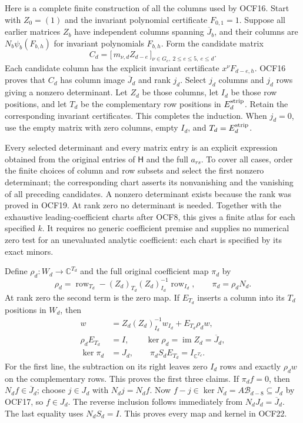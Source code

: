 \documentclass[11pt]{article}
\begin{document}
Here is a complete finite construction of all the columns used
by OCF16. Start with $Z_0=(1)$ and the invariant polynomial
certificate $F_{0,1}=1$. Suppose all earlier matrices $Z_b$ have
independent columns spanning $\overline J_b$, and their columns
are $N_b\psi_b(F_{b,h})$ for invariant polynomials $F_{b,h}$.
Form the candidate matrix
\[
 C_d=\bigl[\,m_{\nu,d}Z_{d-e}\,\bigr]_{
                    \nu\in G_e,\ 2\leq e\leq5,\ e\leq d}.
 \tag{OCF20}
\]
Each candidate column has the explicit invariant certificate
$x^\nu F_{d-e,h}$. OCF16 proves that $C_d$ has column image
$\overline J_d$ and rank $j_d$. Select $j_d$ columns and $j_d$
rows giving a nonzero determinant. Let $Z_d$ be those columns,
let $I_d$ be those row positions, and let $T_d$ be the complementary
row positions in $E_d^{\rm strip}$. Retain the corresponding
invariant certificates. This completes the induction. When
$j_d=0$, use the empty matrix with zero columns, empty $I_d$,
and $T_d=E_d^{\rm strip}$.

Every selected determinant and every matrix entry is an explicit
expression obtained from the original entries of $\mathsf H$ and
the full $a_{rs}$. To cover all cases, order the finite choices
of column and row subsets and select the first nonzero determinant;
the corresponding chart asserts its nonvanishing and the vanishing
of all preceding candidates. A nonzero determinant exists because
the rank was proved in OCF19. At rank zero no determinant is needed.
Together with the exhaustive leading-coefficient charts after
OCF8, this gives a finite atlas for each specified $k$. It requires
no generic coefficient premise and supplies no numerical zero test
for an unevaluated analytic coefficient: each chart is specified
by its exact minors.

Define $\rho_d:W_d\to\mathbb C^{T_d}$ and the full original
coefficient map $\pi_d$ by
\[
 \rho_d=\operatorname{row}_{T_d}
            -(Z_d)_{T_d}(Z_d)_{I_d}^{-1}
                                  \operatorname{row}_{I_d},
 \qquad \pi_d=\rho_dN_d.
 \tag{OCF21}
\]
At rank zero the second term is the zero map. If $E_{T_d}$
inserts a column into its $T_d$ positions in $W_d$, then
\[
 \begin{split}
 w&=Z_d(Z_d)_{I_d}^{-1}w_{I_d}+E_{T_d}\rho_dw,\\
 \rho_dE_{T_d}&=I,\qquad\ker\rho_d=\operatorname{im}Z_d
                                  =\overline J_d,\\
 \ker\pi_d&=J_d,\qquad
       \pi_d S_d E_{T_d}=I_{\mathbb C^{T_d}}.
 \end{split}\tag{OCF22}
\]
For the first line, the subtraction on its right leaves zero
$I_d$ rows and exactly $\rho_dw$ on the complementary rows.
This proves the first three claims. If $\pi_df=0$, then
$N_df\in\overline J_d$; choose $j\in J_d$ with $N_dj=N_df$.
Now $f-j\in\ker N_d=A\mathcal B_{d-8}\subseteq J_d$ by
OCF17, so $f\in J_d$. The reverse inclusion follows immediately
from $N_dJ_d=\overline J_d$. The last equality uses $N_dS_d=I$.
This proves every map and kernel in OCF22.
\end{document}
